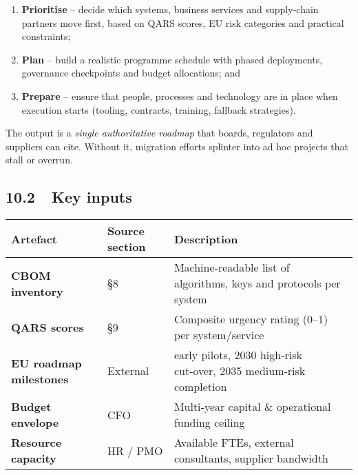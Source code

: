 \documentclass[
  english,
]{article}
\providecommand{\tightlist}{%
  \setlength{\itemsep}{0pt}\setlength{\parskip}{0pt}}
\begin{document}
\begin{enumerate}
\def\labelenumi{\arabic{enumi}.}
\tightlist
\item
  \textbf{Prioritise} -- decide which systems, business services and
  supply‑chain partners move first, based on QARS scores, EU risk
  categories and practical constraints;
\item
  \textbf{Plan} -- build a realistic programme schedule with phased
  deployments, governance checkpoints and budget allocations; and
\item
  \textbf{Prepare} -- ensure that people, processes and technology are
  in place when execution starts (tooling, contracts, training, fallback
  strategies).
\end{enumerate}

The output is a \emph{single authoritative roadmap} that boards,
regulators and suppliers can cite. Without it, migration efforts
splinter into ad hoc projects that stall or overrun.

\subsection{10.2~~Key inputs}\label{key-inputs}

\begin{longtable}[]{@{}
  >{\raggedright\arraybackslash}p{}
  >{\raggedright\arraybackslash}p{}
  >{\raggedright\arraybackslash}p{}@{}}
\toprule\noalign{}
\begin{minipage}[b]{\linewidth}\raggedright
Artefact
\end{minipage} & \begin{minipage}[b]{\linewidth}\raggedright
Source section
\end{minipage} & \begin{minipage}[b]{\linewidth}\raggedright
Description
\end{minipage} \\
\midrule\noalign{}
\endhead
\bottomrule\noalign{}
\endlastfoot
\textbf{CBOM inventory} & §8 & Machine‑readable list of algorithms, keys
and protocols per system \\
\textbf{QARS scores} & §9 & Composite urgency rating (0--1) per
system/service \\
\textbf{EU roadmap milestones} & External & 2026 early pilots, 2030
high‑risk cut‑over, 2035 medium‑risk completion \\
\textbf{Budget envelope} & CFO & Multi‑year capital \& operational
funding ceiling \\
\textbf{Resource capacity} & HR / PMO & Available FTEs, external
consultants, supplier bandwidth \\
\end{longtable}
\end{document}

